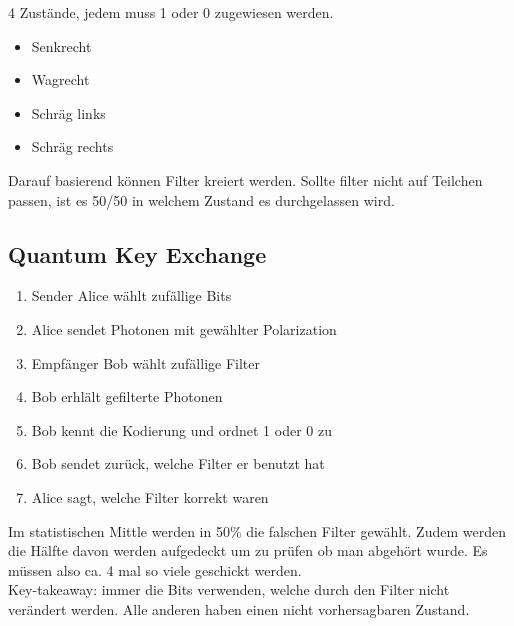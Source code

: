 \documentclass[12pt]{scrartcl}
\begin{document}
4 Zustände, jedem muss 1 oder 0 zugewiesen werden.

\begin{itemize}
    \item Senkrecht
    \item Wagrecht
    \item Schräg links
    \item Schräg rechts
\end{itemize}

Darauf basierend können Filter kreiert werden. Sollte filter nicht auf Teilchen
passen, ist es 50/50 in welchem Zustand es durchgelassen wird.


\subsection{Quantum Key Exchange}

\begin{enumerate}
    \item Sender Alice wählt zufällige Bits
    \item Alice sendet Photonen mit gewählter Polarization
    \item Empfänger Bob wählt zufällige Filter
    \item Bob erhlält gefilterte Photonen
    \item Bob kennt die Kodierung und ordnet 1 oder 0 zu
    \item Bob sendet zurück, welche Filter er benutzt hat
    \item Alice sagt, welche Filter korrekt waren
\end{enumerate}


Im statistischen Mittle werden in 50\% die falschen Filter gewählt. Zudem werden
die Hälfte davon werden aufgedeckt um zu prüfen ob man abgehört wurde. Es müssen
also ca. 4 mal so viele geschickt werden. \\


Key-takeaway: immer die Bits verwenden, welche durch den Filter nicht verändert werden. Alle
anderen haben einen nicht vorhersagbaren Zustand.








\end{document}
